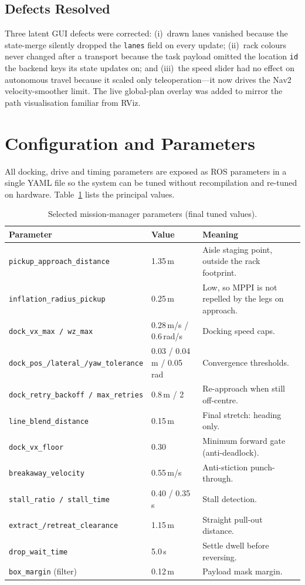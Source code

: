 \documentclass[11pt,a4paper]{article}
\newcommand{\code}[1]{\texttt{\small #1}}
\begin{document}
\subsection{Defects Resolved}
Three latent GUI defects were corrected: (i)~drawn lanes vanished because the
state-merge silently dropped the \code{lanes} field on every update;
(ii)~rack colours never changed after a transport because the task payload
omitted the location \code{id} the backend keys its state updates on; and
(iii)~the speed slider had no effect on autonomous travel because it scaled
only teleoperation---it now drives the Nav2 velocity-smoother limit. The live
global-plan overlay was added to mirror the path visualisation familiar from
RViz.

\section{Configuration and Parameters}\label{sec:config}
All docking, drive and timing parameters are exposed as ROS parameters in a
single YAML file so the system can be tuned without recompilation and
re-tuned on hardware. Table~\ref{tab:params} lists the principal values.

\begin{table}[h]\centering\small
\caption{Selected mission-manager parameters (final tuned values).}\label{tab:params}
\begin{tabular}{@{}llp{6.6cm}@{}}
\toprule
\textbf{Parameter} & \textbf{Value} & \textbf{Meaning}\\
\midrule
\code{pickup\_approach\_distance} & 1.35\,m & Aisle staging point, outside the rack footprint.\\
\code{inflation\_radius\_pickup}  & 0.25\,m & Low, so MPPI is not repelled by the legs on approach.\\
\code{dock\_vx\_max / wz\_max}     & 0.28\,m/s / 0.6\,rad/s & Docking speed caps.\\
\code{dock\_pos\_/lateral\_/yaw\_tolerance}  & 0.03 / 0.04\,m / 0.05\,rad & Convergence thresholds.\\
\code{dock\_retry\_backoff / max\_retries} & 0.8\,m / 2 & Re-approach when still off-centre.\\
\code{line\_blend\_distance}      & 0.15\,m & Final stretch: heading only.\\
\code{dock\_vx\_floor}            & 0.30 & Minimum forward gate (anti-deadlock).\\
\code{breakaway\_velocity}        & 0.55\,m/s & Anti-stiction punch-through.\\
\code{stall\_ratio / stall\_time} & 0.40 / 0.35\,s & Stall detection.\\
\code{extract\_/retreat\_clearance} & 1.15\,m & Straight pull-out distance.\\
\code{drop\_wait\_time}           & 5.0\,s & Settle dwell before reversing.\\
\code{box\_margin} (filter)       & 0.12\,m & Payload mask margin.\\
\bottomrule
\end{tabular}
\end{table}
\end{document}
